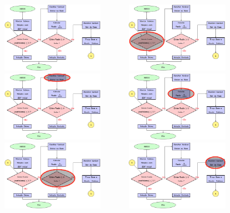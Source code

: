 \begin{frame}
\begin{columns}
\begin{column}{0.5\textwidth}
				
		\end{column}
		\begin{column}{0.5\textwidth}
			\only<1>
			{
				\includegraphics[width=5.5cm,height=3cm]{Alg_1.png}
			}
			\only<2>
			{
				\includegraphics[width=5.5cm,height=3cm]{Alg_2.png}
			}
			\only<3>
			{
				\includegraphics[width=5.5cm,height=3cm]{Alg_3.png}
			}
			\only<4>
			{
				\includegraphics[width=5.5cm,height=3cm]{Alg_4.png}
			}
			\only<5>
			{
				\includegraphics[width=5.5cm,height=3cm]{Alg_5.png}
			}
			\only<6>
			{
				\includegraphics[width=5.5cm,height=3cm]{Alg_6.png}
}
\end{column}
\end{columns}
\end{frame}
